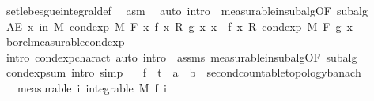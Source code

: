 \begin{isabellebody}
\ set{\isacharunderscore}{\kern0pt}lebesgue{\isacharunderscore}{\kern0pt}integral{\isacharunderscore}{\kern0pt}def\ \isamarkupfalse%
\ asm\ \isamarkupfalse%
\ {\isacharparenleft}{\kern0pt}auto\ intro{\isacharbang}{\kern0pt}{\isacharcolon}{\kern0pt}\ {\isacharasterisk}{\kern0pt}\ measurable{\isacharunderscore}{\kern0pt}in{\isacharunderscore}{\kern0pt}subalg{\isacharbrackleft}{\kern0pt}OF\ subalg{\isacharbrackright}{\kern0pt}{\isacharparenright}{\kern0pt}\isanewline
\ \ \isacommand{{\isacharbraceright}{\kern0pt}}\isamarkupfalse%
\isanewline
\ \ \isamarkupfalse%
\ {\isachardoublequoteopen}AE\ x\ in\ M{\isachardot}{\kern0pt}\ cond{\isacharunderscore}{\kern0pt}exp\ M\ F\ {\isacharparenleft}{\kern0pt}{\isasymlambda}x{\isachardot}{\kern0pt}\ f\ x\ {\isacharasterisk}{\kern0pt}\isactrlsub R\ g\ x{\isacharparenright}{\kern0pt}\ x\ {\isacharequal}{\kern0pt}\ f\ x\ {\isacharasterisk}{\kern0pt}\isactrlsub R\ cond{\isacharunderscore}{\kern0pt}exp\ M\ F\ g\ x{\isachardoublequoteclose}\ \isamarkupfalse%
\ borel{\isacharunderscore}{\kern0pt}measurable{\isacharunderscore}{\kern0pt}cond{\isacharunderscore}{\kern0pt}exp\ \isamarkupfalse%
\ {\isacharparenleft}{\kern0pt}intro\ cond{\isacharunderscore}{\kern0pt}exp{\isacharunderscore}{\kern0pt}charact{\isacharcomma}{\kern0pt}\ auto\ intro{\isacharbang}{\kern0pt}{\isacharcolon}{\kern0pt}\ {\isacharasterisk}{\kern0pt}\ assms\ measurable{\isacharunderscore}{\kern0pt}in{\isacharunderscore}{\kern0pt}subalg{\isacharbrackleft}{\kern0pt}OF\ subalg{\isacharbrackright}{\kern0pt}{\isacharparenright}{\kern0pt}\isanewline
{}\isamarkupfalse%
%
\endisatagproof
{\isafoldproof}%
%
\isadelimproof
\isanewline
%
\endisadelimproof
\isanewline
{}\isamarkupfalse%
\ cond{\isacharunderscore}{\kern0pt}exp{\isacharunderscore}{\kern0pt}sum\ {\isacharbrackleft}{\kern0pt}intro{\isacharcomma}{\kern0pt}\ simp{\isacharbrackright}{\kern0pt}{\isacharcolon}{\kern0pt}\isanewline
\ \ \ f\ {\isacharcolon}{\kern0pt}{\isacharcolon}{\kern0pt}\ {\isachardoublequoteopen}{\isacharprime}{\kern0pt}t\ {\isasymRightarrow}\ {\isacharprime}{\kern0pt}a\ {\isasymRightarrow}\ {\isacharprime}{\kern0pt}b\ {\isacharcolon}{\kern0pt}{\isacharcolon}{\kern0pt}\ {\isacharbraceleft}{\kern0pt}second{\isacharunderscore}{\kern0pt}countable{\isacharunderscore}{\kern0pt}topology{\isacharcomma}{\kern0pt}banach{\isacharbraceright}{\kern0pt}{\isachardoublequoteclose}\isanewline
\ \ \ {\isacharbrackleft}{\kern0pt}measurable{\isacharbrackright}{\kern0pt}{\isacharcolon}{\kern0pt}\ {\isachardoublequoteopen}{\isasymAnd}i{\isachardot}{\kern0pt}\ integrable\ M\ {\isacharparenleft}{\kern0pt}f\ i{\isacharparenright}{\kern0pt}{\isachardoublequoteclose}\isanewline

\end{isabellebody}
